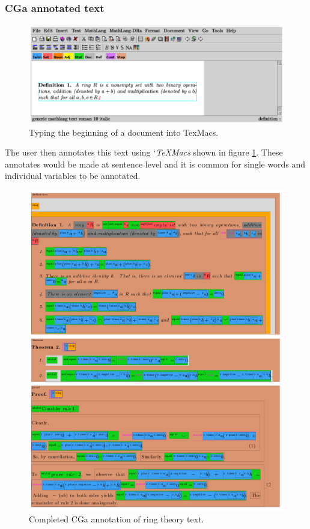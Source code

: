 \subsubsection{CGa annotated text}

\begin{figure}[H]
\begin{center}
\includegraphics[scale=0.4]{Figures/Background/texmacs.png}
\end{center}
\caption{Typing the beginning of a document into TexMacs. \label{fig:texmacs}}
\end{figure}

The user then annotates this text using `\emph{TeXMacs} shown in figure
\ref{fig:texmacs}. These annotates would be made at sentence level and it is
common for single words and individual variables to be annotated.

\begin{figure}[H]
\begin{center}
\includegraphics[scale=0.8]{Figures/Background/ringtheorycga.png}
\end{center}
\caption{Completed CGa annotation of ring theory text. \label{fig:ringcga}}
\end{figure}

